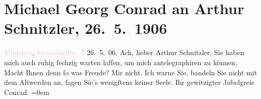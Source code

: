 

               \section[Michael Georg Conrad an Arthur Schnitzler, 26. 5. 1906]{ Michael Georg Conrad an Arthur Schnitzler, 26. 5. 1906}\nopagebreak{}\rehead{ }\normalsize\beginnumbering{} \toendnotes[C]{\smallbreak\pagebreak[2]} 
\pstart
           \noindent{}{\pb}\textcolor{pink}{München}{}\ledrightnote{\textcolor{pink}{München}}, \textcolor{pink}{Steinsdorfſtr. 7}{}\ledrightnote{\textcolor{pink}{Steinsdorfstraße}}\pend
           \pstart
           \raggedleft{}26. 5. 06.\pend
           \pstart
           Ach, lieber Arthur Schnitzler, Sie haben mich auch ruhig ſechzig
                    warten laſſen, um mich antelegraphiren zu können. Macht Ihnen denn ſo was
                    Freude? Mir nicht. Ich warne Sie, bandeln Sie nicht mit dem Altwerden an, ſagen
                    Sie’s wenigſtens keiner Seele.\pend
           \pstart
           Ihr gewitzigter Jubelgreis{\\[\baselineskip]}\spacefill\mbox{Conrad.}\pend
           \leftskip=0em{}\endnumbering{}  
      